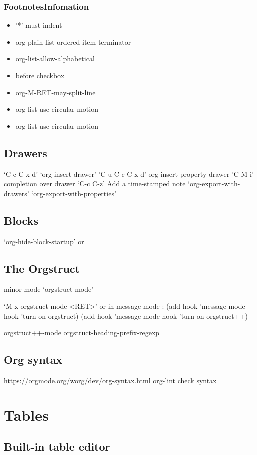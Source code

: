 \documentclass[11pt]{article}
\begin{document}
\subsubsection{FootnotesInfomation}
\label{sec:org3c04905}
\begin{itemize}
\item '*' must indent
\item org-plain-list-ordered-item-terminator
\item org-list-allow-alphabetical
\setcounter{enumi}{19}
\item before checkbox
\item org-M-RET-may-split-line
\item org-list-use-circular-motion
\item org-list-use-circular-motion
\end{itemize}
\subsection{Drawers}
\label{sec:orgcfe4a3e}
‘C-c C-x d’   ‘org-insert-drawer’
'C-u C-c C-x d'    org-insert-property-drawer
'C-M-i'  completion over drawer
‘C-c C-z’ Add a time-stamped note
‘org-export-with-drawers’
‘org-export-with-properties’ 
\subsection{Blocks}
\label{sec:orge7957fa}
‘org-hide-block-startup’ 
or
\subsection{The Orgstruct}
\label{sec:org15fa10e}
minor mode ‘orgstruct-mode’

‘M-x orgstruct-mode <RET>’
or
in message mode :
(add-hook 'message-mode-hook 'turn-on-orgstruct)
(add-hook 'message-mode-hook 'turn-on-orgstruct++)

orgstruct++-mode
orgstruct-heading-prefix-regexp
\subsection{Org syntax}
\label{sec:orgde8eb12}
\url{https://orgmode.org/worg/dev/org-syntax.html}
org-lint  check syntax
\section{Tables}
\label{sec:orgf33bf5a}
\subsection{Built-in table editor}
\label{sec:orgb3ce69d}
\end{document}
